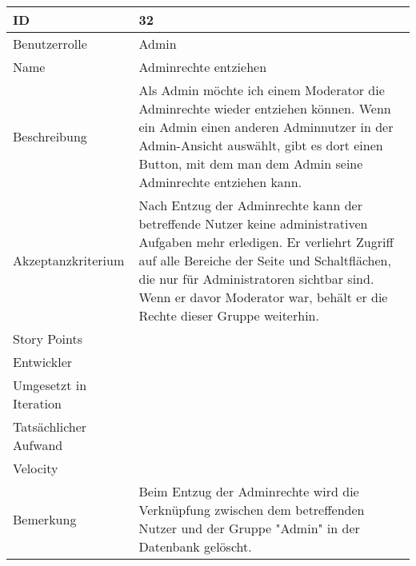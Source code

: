 \begin{tabularx}{\textwidth}{|p{}|X|}
	\hline
	ID & 32 \\
	\hline
	Benutzerrolle & Admin \\
	\hline
	Name & Adminrechte entziehen\\
	\hline
	Beschreibung & Als Admin möchte ich einem Moderator die Adminrechte wieder entziehen können. Wenn ein Admin einen anderen Adminnutzer in der Admin-Ansicht auswählt, gibt es dort einen Button, mit dem man dem Admin seine Adminrechte entziehen kann.  \\
	\hline
	Akzeptanzkriterium & Nach Entzug der Adminrechte kann der betreffende Nutzer keine administrativen Aufgaben mehr erledigen. Er verliehrt Zugriff auf alle Bereiche der Seite und Schaltflächen, die nur für Administratoren sichtbar sind. Wenn er davor Moderator war, behält er die Rechte dieser Gruppe weiterhin. \\
	\hline
	Story Points &  \\
	\hline
	Entwickler &  \\
	\hline
	Umgesetzt in Iteration & \\
	\hline
	Tatsächlicher Aufwand & \\
	\hline
	Velocity & \\
	\hline
	Bemerkung & Beim Entzug der Adminrechte wird die Verknüpfung zwischen dem betreffenden Nutzer und der Gruppe "Admin" in der Datenbank gelöscht.\\
	\hline
\end{tabularx}
\vspace{20pt}
